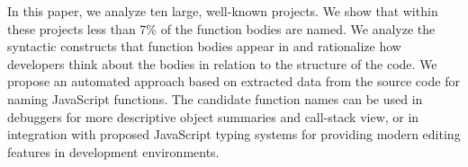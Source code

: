 \documentclass[10pt, preprint]{sigplanconf}
\begin{document}
In this paper, we analyze ten large, well-known projects. We show that within these projects less than 7\% of the function bodies are named. 
We analyze the syntactic constructs that function bodies appear in and rationalize how developers think about the bodies in relation to the structure of the code.
We propose an automated approach based on extracted data from the source code for naming JavaScript functions. The candidate function names can be used in debuggers for more descriptive object summaries and call-stack view, or in integration with proposed JavaScript typing systems for providing modern editing features in development environments. 




\begin{table}

\centering
{}
\caption{The total number of functions and the number of named functions (and percent named)  in ten large JavaScript projects. See appendix 1 for the project citations.} 
\label{js-functions} 
\end{table}    
\end{document}
